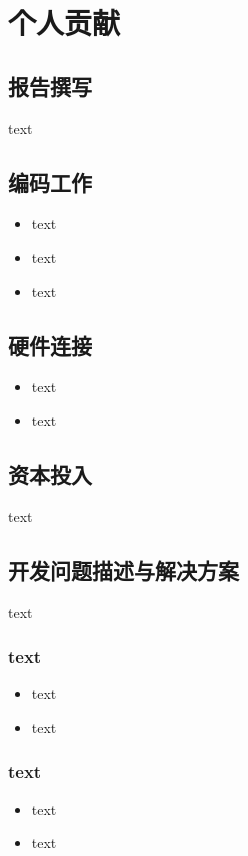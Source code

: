 
\chapter{个人贡献}


\section{报告撰写}text


\section{编码工作}\begin{itemize}
    \item text
    \item text
    \item text
\end{itemize}
\section{硬件连接}\begin{itemize}
    \item text
    \item text
\end{itemize}
\section{资本投入}text


\section{开发问题描述与解决方案}
text

\subsection{text}
\begin{itemize}
    \item text
    \item text
\end{itemize}



\subsection{text}
\begin{itemize}
    \item text
    \item text
\end{itemize}



